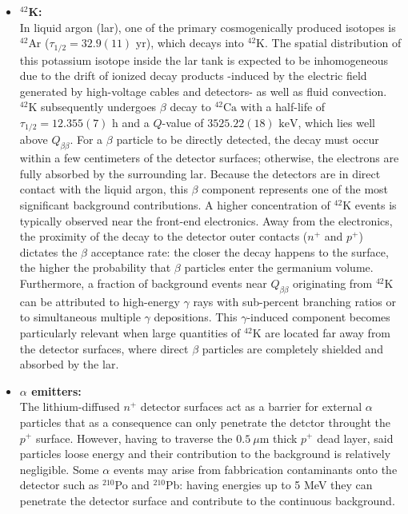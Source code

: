 \begin{itemize}
    \item \textbf{${}^{42}$K:}\\
            In liquid argon (\ac{lar}), one of the primary cosmogenically produced isotopes is ${}^{42}\text{Ar}$ ($\tau_{1/2} = 32.9(11)\text{ yr}$), which decays into ${}^{42}\text{K}$. The spatial distribution of this potassium isotope inside the \ac{lar} tank is expected to be inhomogeneous due to the drift of ionized decay products -induced by the electric field generated by high-voltage cables and detectors- as well as fluid convection. ${}^{42}\text{K}$ subsequently undergoes $\beta$ decay to ${}^{42}\text{Ca}$ with a half-life of $\tau_{1/2} = 12.355(7)\text{ h}$ and a $Q$-value of $3525.22(18)\text{ keV}$, which lies well above $Q_{\beta\beta}$. 
            For a $\beta$ particle to be directly detected, the decay must occur within a few centimeters of the detector surfaces; otherwise, the electrons are fully absorbed by the surrounding \ac{lar}. Because the detectors are in direct contact with the liquid argon, this $\beta$ component represents one of the most significant background contributions. A higher concentration of ${}^{42}\text{K}$ events is typically observed near the front-end electronics. Away from the electronics, the proximity of the decay to the detector outer contacts ($n^+$ and $p^+$) dictates the $\beta$ acceptance rate: the closer the decay happens to the surface, the higher the probability that $\beta$ particles enter the germanium volume. 
            Furthermore, a fraction of background events near $Q_{\beta\beta}$ originating from ${}^{42}\text{K}$ can be attributed to high-energy $\gamma$ rays with sub-percent branching ratios or to simultaneous multiple $\gamma$ depositions. This $\gamma$-induced component becomes particularly relevant when large quantities of ${}^{42}\text{K}$ are located far away from the detector surfaces, where direct $\beta$ particles are completely shielded and absorbed by the \ac{lar}.

    \item \textbf{$\alpha$ emitters:}\\
            The lithium-diffused $n^+$ detector surfaces act as a barrier for external $\alpha$ particles that as a consequence can only penetrate the detctor throught the $p^+$ surface. However, having to traverse the $0.5~\mu$m thick $p^+$ dead layer, said particles loose energy and their contribution to the background is relatively negligible. Some $\alpha$ events may arise from fabbrication contaminants onto the detector such as ${}^{210}$Po and ${}^{210}$Pb: having energies up to 5 MeV they can penetrate the detector surface and contribute to the continuous background.


\end{itemize}
